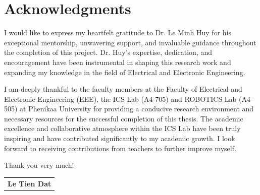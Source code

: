 \section*{Acknowledgments}

I would like to express my heartfelt gratitude to Dr. Le Minh Huy for his exceptional mentorship, unwavering support, and invaluable guidance throughout the completion of this project. Dr. Huy's expertise, dedication, and encouragement have been instrumental in shaping this research work and expanding my knowledge in the field of Electrical and Electronic Engineering.

I am deeply thankful to the faculty members at the Faculty of Electrical and Electronic Engineering (EEE), the ICS Lab (A4-705) and ROBOTICS Lab (A4-505) at Phenikaa University for providing a conducive research environment and necessary resources for the successful completion of this thesis. The academic excellence and collaborative atmosphere within the ICS Lab have been truly inspiring and have contributed significantly to my academic growth.
I look forward to receiving contributions from teachers to further improve myself.

Thank you very much!


\begin{flushright}
	\begin{tabular}{c}
		\textbf{Le Tien Dat}\\
	\end{tabular}
\end{flushright}
